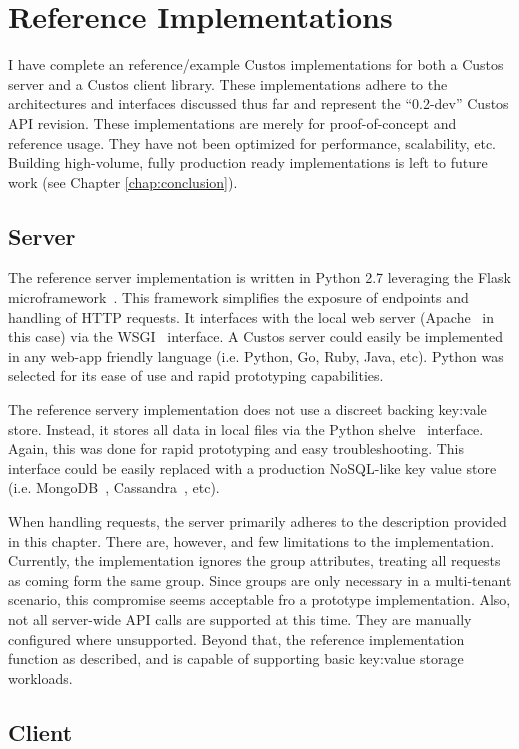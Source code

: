 \section{Reference Implementations}

I have complete an reference/example Custos implementations for both a
Custos server and a Custos client library. These implementations adhere
to the architectures and interfaces discussed thus far and represent the
``0.2-dev'' Custos API revision. These implementations are merely for
proof-of-concept and reference usage. They have not been optimized for
performance, scalability, etc. Building high-volume, fully production
ready implementations is left to future work (see Chapter
\ref{chap:conclusion}).

\subsection{Server}

The reference server implementation is written in Python 2.7
leveraging the Flask microframework~\cite{python-flask}. This
framework simplifies the exposure of endpoints and handling of HTTP
requests. It interfaces with the local web server
(Apache~\cite{apache} in this case) via the WSGI~\cite{pep-wsgi}
interface. A Custos server could easily be implemented in any web-app
friendly language (i.e. Python, Go, Ruby, Java, etc). Python was
selected for its ease of use and rapid prototyping capabilities.

The reference servery implementation does not use a discreet backing
key:vale store. Instead, it stores all data in local files via the
Python shelve~\cite{python-shelve} interface. Again, this was done for
rapid prototyping and easy troubleshooting. This interface could be
easily replaced with a production NoSQL-like key value store
(i.e. MongoDB~\cite{mongodb}, Cassandra~\cite{cassandra}, etc).

When handling requests, the server primarily adheres to the
description provided in this chapter. There are, however, and few
limitations to the implementation. Currently, the implementation
ignores the group attributes, treating all requests as coming form the
same group. Since groups are only necessary in a multi-tenant
scenario, this compromise seems acceptable fro a prototype
implementation. Also, not all server-wide API calls are supported at
this time. They are manually configured where unsupported. Beyond
that, the reference implementation function as described, and is
capable of supporting basic key:value storage workloads.

\subsection{Client}



